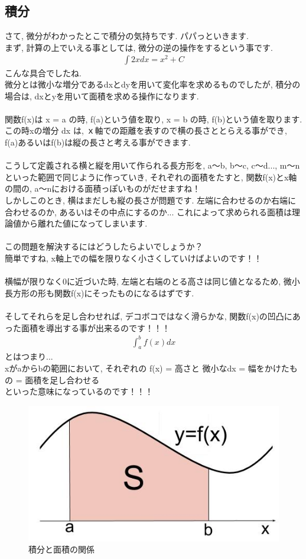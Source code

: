 \documentclass[11pt,a4paper]{jreport}
\begin{document}
\subsection{積分}
さて, 微分がわかったとこで積分の気持ちです. パパっといきます.\\
まず, 計算の上でいえる事としては, 微分の逆の操作をするという事です.
\begin{eqnarray}
\int 2x dx= x^2 + C
\end{eqnarray}
こんな具合でしたね. \\
微分とは微小な増分であるdxとdyを用いて変化率を求めるものでしたが, 積分の場合は, dxとyを用いて面積を求める操作になります.\\
\\
関数f(x)は x = a の時, f(a)という値を取り, x = b の時, f(b)という値を取ります. この時xの増分 dx は, ｘ軸での距離を表すので横の長さととらえる事ができ, f(a)あるいはf(b)は縦の長さと考える事ができます.\\
\\
こうして定義される横と縦を用いて作られる長方形を, a～b, b～c, c～d..., m～nといった範囲で同じように作っていき, それぞれの面積をたすと, 関数f(x)とx軸の間の, a～nにおける面積っぽいものがだせますね！\\
しかしこのとき, 横はまだしも縦の長さが問題です. 左端に合わせるのか右端に合わせるのか, あるいはその中点にするのか... これによって求められる面積は理論値から離れた値になってしまいます.\\
\\
この問題を解決するにはどうしたらよいでしょうか？\\
簡単ですね, x軸上での幅を限りなく小さくしていけばよいのです！！\\
\\
横幅が限りなく0に近づいた時, 左端と右端のとる高さは同じ値となるため, 微小長方形の形も関数f(x)にそったものになるはずです.\\
\\
そしてそれらを足し合わせれば, デコボコではなく滑らかな, 関数f(x)の凹凸にあった面積を導出する事が出来るのです！！！
\begin{eqnarray}
\int_a^b f(x) dx
\end{eqnarray}
とはつまり...\\
xがaからbの範囲において, それぞれの f(x) = 高さと 微小なdx = 幅をかけたもの = 面積を足し合わせる\\
といった意味になっているのです！！！


\begin{figure}[H]
\label{im:integral}
  \centering
  \includegraphics[width=120mm,bb=0 0 480 259]{figures/int.jpg}
  \caption{積分と面積の関係}
\end{figure}
\end{document}
